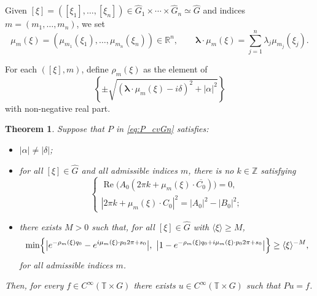 \documentclass[11pt,reqno]{amsart}
\numberwithin{equation}{section}
\newtheorem{theorem}{Theorem}[section]
\begin{document}
	Given $[\xi]=([\xi_1],\dots,[\xi_n])\in\widehat{G}_1\times\cdots\times\widehat{G}_n\simeq\widehat{G}$ and indices $m=(m_1,\dots,m_n)$, we set
	\[
	\mu_m(\xi)=(\mu_{m_1}(\xi_1),\dots,\mu_{m_n}(\xi_n))\in\mathbb{R}^n,
	\qquad
	\boldsymbol{\lambda}\cdot \mu_m(\xi)=\sum_{j=1}^n \lambda_j \mu_{m_j}(\xi_j).
	\]
	
	For each $([\xi],m)$, define $\rho_m(\xi)$ as the element of
	\[
	\left\{\pm\sqrt{(\boldsymbol{\lambda}\cdot\mu_m(\xi)-i\delta)^2+|\alpha|^2}\right\}
	\]
	with non-negative real part.
	
	\begin{theorem}\label{thm:product_groups}
		Suppose that $P$ in \eqref{eq:P_cvGn} satisfies:
		\begin{itemize}
			\item[(I)] $|\alpha|\neq |\delta|$;
			\item[(II)] for all $[\xi]\in\widehat G$ and all admissible indices $m$, there is no $k\in\mathbb{Z}$ satisfying
			\[
			\begin{cases}
				\operatorname{Re}\bigl(A_0(2\pi k+\mu_m(\xi)\cdot \overline{C_0})\bigr)=0,\\[2mm]
				|2\pi k+\mu_m(\xi)\cdot C_0|^2=|A_0|^2-|B_0|^2;
			\end{cases}
			\]
			\item[(III)] there exists $M>0$ such that, for all $[\xi]\in\widehat G$ with $\langle\xi\rangle\ge M$,
			\[
			\min\Bigl\{\bigl|e^{-\rho_m(\xi) q_0}-e^{i\mu_m(\xi)\cdot p_0 2\pi+s_0}\bigr|,
			\ \bigl|1-e^{-\rho_m(\xi) q_0+i\mu_m(\xi)\cdot p_0 2\pi+s_0}\bigr|\Bigr\}
			\ge \langle\xi\rangle^{-M},
			\]
			for all admissible indices $m$.
		\end{itemize}
		
		Then, for every $f\in C^\infty(\mathbb{T}\times G)$ there exists $u\in C^\infty(\mathbb{T}\times G)$ such that $Pu=f$.
	\end{theorem}
	

	
	
	
	 
	
	
\end{document}
